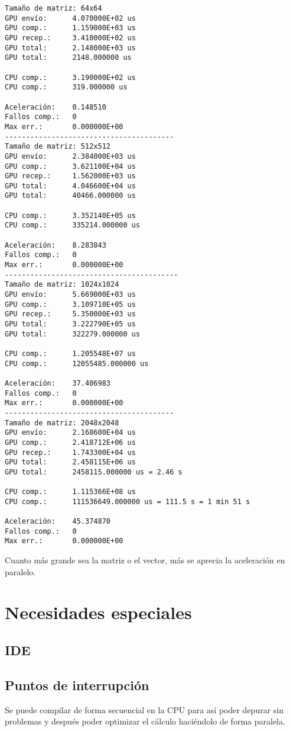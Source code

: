 \documentclass[12pt,a4paper]{article}
\begin{document}
\begin{lstlisting}
Tamaño de matriz: 64x64
GPU envío:      4.070000E+02 us
GPU comp.:      1.159000E+03 us
GPU recep.:     3.410000E+02 us
GPU total:      2.148000E+03 us
GPU total:      2148.000000 us

CPU comp.:      3.190000E+02 us
CPU comp.:      319.000000 us

Aceleración:    0.148510
Fallos comp.:   0
Max err.:       0.000000E+00
----------------------------------------
Tamaño de matriz: 512x512
GPU envío:      2.384000E+03 us
GPU comp.:      3.621100E+04 us
GPU recep.:     1.562000E+03 us
GPU total:      4.046600E+04 us
GPU total:      40466.000000 us

CPU comp.:      3.352140E+05 us
CPU comp.:      335214.000000 us

Aceleración:    8.283843
Fallos comp.:   0
Max err.:       0.000000E+00
-----------------------------------------
Tamaño de matriz: 1024x1024
GPU envío:      5.669000E+03 us
GPU comp.:      3.109710E+05 us
GPU recep.:     5.350000E+03 us
GPU total:      3.222790E+05 us
GPU total:      322279.000000 us

CPU comp.:      1.205548E+07 us
CPU comp.:      12055485.000000 us

Aceleración:    37.406983
Fallos comp.:   0
Max err.:       0.000000E+00
----------------------------------------
Tamaño de matriz: 2048x2048
GPU envío:      2.168600E+04 us
GPU comp.:      2.418712E+06 us
GPU recep.:     1.743300E+04 us
GPU total:      2.458115E+06 us
GPU total:      2458115.000000 us = 2.46 s

CPU comp.:      1.115366E+08 us
CPU comp.:      111536649.000000 us = 111.5 s = 1 min 51 s

Aceleración:    45.374870
Fallos comp.:   0
Max err.:       0.000000E+00
\end{lstlisting}

Cuanto más grande sea la matriz o el vector, más se aprecia la aceleración en
paralelo.
\section{Necesidades especiales}
\subsection{IDE}
\subsection{Puntos de interrupción}
Se puede compilar de forma secuencial en la CPU para así poder depurar sin
problemas y después poder optimizar el cálculo haciéndolo de forma paralela.
\end{document}
